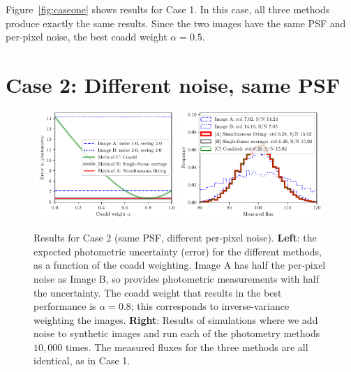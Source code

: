 \documentclass[letter,11pt]{article}
\begin{document}
Figure~\ref{fig:caseone} shows results for Case 1.  In this case, all
three methods produce exactly the same results.  Since the two images
have the same PSF and per-pixel noise, the best coadd weight $\alpha =
0.5$.

\newpage

\section*{Case 2: Different noise, same PSF}

\begin{figure}[b!]
  \begin{center}
    \includegraphics[width=0.48\textwidth]{coadd-02}
    \includegraphics[width=0.48\textwidth]{coadd-03}
  \end{center}
  \caption{Results for Case 2 (same PSF, different per-pixel noise).
    \textbf{Left}: the expected photometric
    uncertainty (error) for the different methods, as a function of
    the coadd weighting.  Image A has half the per-pixel noise as Image B,
    so provides photometric measurements with half the uncertainty.
    The coadd weight that results in the best performance is $\alpha = 0.8$;
    this corresponds to inverse-variance weighting the images.
    \newline \textbf{Right}: Results of simulations where we
    add noise to synthetic images and run each of the
    photometry methods $10,000$ times.  The measured fluxes for
    the three methods are all identical, as in Case 1.
    \label{fig:casetwo}}
\end{figure}
\end{document}
